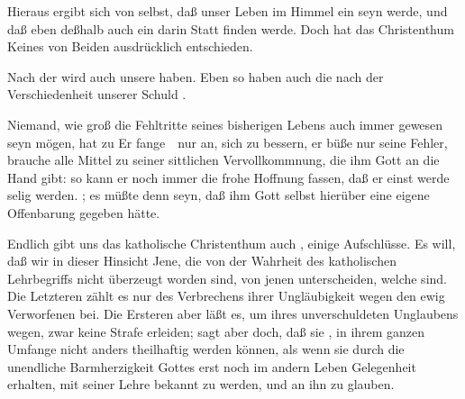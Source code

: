 \begin{aufza}
\begin{RWanm}
Hieraus ergibt sich von selbst, daß unser Leben im Himmel ein  seyn werde, und daß eben deßhalb auch ein  darin Statt finden werde. Doch hat das Christenthum Keines von Beiden ausdrücklich entschieden.
\end{RWanm}
\item Nach der  wird auch unsere  haben. Eben so haben auch die  nach der Verschiedenheit unserer Schuld .
\item Niemand, wie groß die Fehltritte seines bisherigen Lebens auch immer gewesen seyn mögen, hat zu  Er fange~\ nur an, sich zu bessern, er büße nur seine Fehler, brauche alle Mittel zu seiner sittlichen Vervollkommnung, die ihm Gott an die Hand gibt: so kann er noch immer die frohe Hoffnung fassen, daß er einst werde selig werden. ; es müßte denn seyn, daß ihm Gott selbst hierüber eine eigene Offenbarung gegeben hätte.
\item Endlich gibt uns das katholische Christenthum auch , einige Aufschlüsse. Es will, daß wir in dieser Hinsicht Jene, die von der Wahrheit des katholischen Lehrbegriffs  nicht überzeugt worden sind, von jenen unterscheiden, welche  sind. Die Letzteren zählt es nur des Verbrechens ihrer Ungläubigkeit wegen den ewig Verworfenen bei. Die Ersteren aber läßt es, um ihres unverschuldeten Unglaubens wegen, zwar keine Strafe erleiden; sagt aber doch, daß sie , in ihrem ganzen Umfange nicht anders theilhaftig werden können, als wenn sie durch die unendliche Barmherzigkeit Gottes erst noch im andern Leben Gelegenheit erhalten, mit seiner Lehre bekannt zu werden, und an ihn zu glauben.
\end{aufza}

